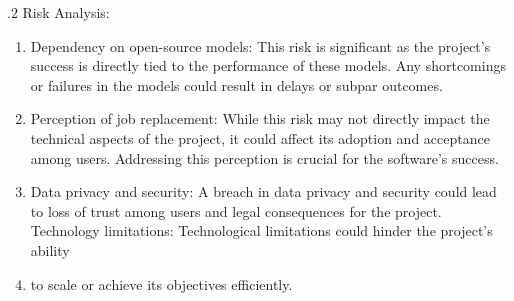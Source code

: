 \documentclass[12pt]{article}
\begin{document}
.2 Risk Analysis:
\begin{enumerate}
\item Dependency on open-source models: This risk is significant as the project's success is directly tied to the performance of these models. Any shortcomings or failures in the models could result in delays or subpar outcomes.
\item Perception of job replacement: While this risk may not directly impact the technical aspects of the project, it could affect its adoption and acceptance among users. Addressing this perception is crucial for the software's success.
\item Data privacy and security: A breach in data privacy and security could lead to loss of trust among users and legal consequences for the project.
Technology limitations: Technological limitations could hinder the project's ability \item to scale or achieve its objectives efficiently.
\end{enumerate}
\end{document}

